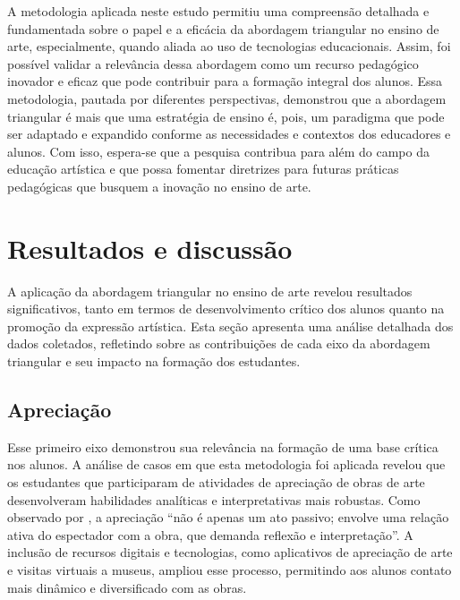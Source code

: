 \documentclass[portuguese]{textolivre}
\begin{document}
A metodologia aplicada neste estudo permitiu uma compreensão detalhada e fundamentada sobre o papel e a eficácia da abordagem triangular no ensino de arte, especialmente, quando aliada ao uso de tecnologias educacionais. Assim, foi possível validar a relevância dessa abordagem como um recurso pedagógico inovador e eficaz que pode contribuir para a formação integral dos alunos. Essa metodologia, pautada por diferentes perspectivas, demonstrou que a abordagem triangular é mais que uma estratégia de ensino é, pois, um paradigma que pode ser adaptado e expandido conforme as necessidades e contextos dos educadores e alunos. Com isso, espera-se que a pesquisa contribua para além do campo da educação artística e que possa fomentar diretrizes para futuras práticas pedagógicas que busquem a inovação no ensino de arte.


\section{Resultados e discussão}\label{sec-fmt-manuscrito}
A aplicação da abordagem triangular no ensino de arte revelou resultados significativos, tanto em termos de desenvolvimento crítico dos alunos quanto na promoção da expressão artística. Esta seção apresenta uma análise detalhada dos dados coletados, refletindo sobre as contribuições de cada eixo da abordagem triangular e seu impacto na formação dos estudantes.


\subsection{Apreciação}\label{sec-formato}
Esse primeiro eixo demonstrou sua relevância na formação de uma base crítica nos alunos. A análise de casos em que esta metodologia foi aplicada revelou que os estudantes que participaram de atividades de apreciação de obras de arte desenvolveram habilidades analíticas e interpretativas mais robustas. Como observado por \textcite{barbosa2010arte}, a apreciação “não é apenas um ato passivo; envolve uma relação ativa do espectador com a obra, que demanda reflexão e interpretação”. A inclusão de recursos digitais e tecnologias, como aplicativos de apreciação de arte e visitas virtuais a museus, ampliou esse processo, permitindo aos alunos contato mais dinâmico e diversificado com as obras.
\end{document}
